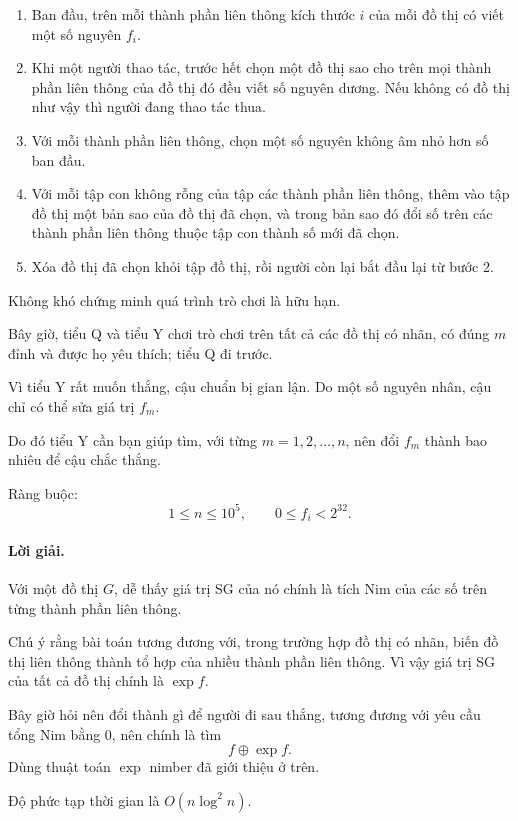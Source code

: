 \documentclass[11pt]{article}
\begin{document}
\begin{enumerate}
  \item Ban đầu, trên mỗi thành phần liên thông kích thước \(i\) của mỗi đồ thị
  có viết một số nguyên \(f_i\).
  \item Khi một người thao tác, trước hết chọn một đồ thị sao cho trên mọi thành
  phần liên thông của đồ thị đó đều viết số nguyên dương. Nếu không có đồ thị
  như vậy thì người đang thao tác thua.
  \item Với mỗi thành phần liên thông, chọn một số nguyên không âm nhỏ hơn số
  ban đầu.
  \item Với mỗi tập con không rỗng của tập các thành phần liên thông, thêm vào
  tập đồ thị một bản sao của đồ thị đã chọn, và trong bản sao đó đổi số trên các
  thành phần liên thông thuộc tập con thành số mới đã chọn.
  \item Xóa đồ thị đã chọn khỏi tập đồ thị, rồi người còn lại bắt đầu lại từ
  bước 2.
\end{enumerate}

Không khó chứng minh quá trình trò chơi là hữu hạn.

Bây giờ, tiểu Q và tiểu Y chơi trò chơi trên tất cả các đồ thị có nhãn, có đúng
\(m\) đỉnh và được họ yêu thích; tiểu Q đi trước.

Vì tiểu Y rất muốn thắng, cậu chuẩn bị gian lận. Do một số nguyên nhân, cậu chỉ
có thể sửa giá trị \(f_m\).

Do đó tiểu Y cần bạn giúp tìm, với từng \(m=1,2,\ldots,n\), nên đổi \(f_m\) thành
bao nhiêu để cậu chắc thắng.

Ràng buộc:
\[
  1\le n\le 10^5,\qquad 0\le f_i<2^{32}.
\]

\paragraph{Lời giải.}
Với một đồ thị \(G\), dễ thấy giá trị SG của nó chính là tích Nim của các số
trên từng thành phần liên thông.

Chú ý rằng bài toán tương đương với, trong trường hợp đồ thị có nhãn, biến đồ
thị liên thông thành tổ hợp của nhiều thành phần liên thông. Vì vậy giá trị SG
của tất cả đồ thị chính là \(\exp f\).

Bây giờ hỏi nên đổi thành gì để người đi sau thắng, tương đương với yêu cầu tổng
Nim bằng \(0\), nên chính là tìm
\[
  f\oplus \exp f.
\]
Dùng thuật toán \(\exp\) nimber đã giới thiệu ở trên.

Độ phức tạp thời gian là \(O(n\log^2 n)\).
\end{document}
